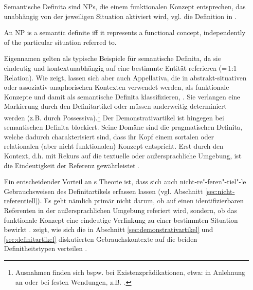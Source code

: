 \noindent
Semantische Definita sind NPs, die einem funktionalen Konzept entsprechen, das unabhängig von der jeweiligen Situation aktiviert wird, vgl. die Definition in . 

\begin{exe}
	\ex \label{semdef}  An NP is a semantic definite iff it represents a functional concept, independently of the particular situation referred to. \parencite[299]{Lobner1985}
\end{exe}

Eigennamen gelten als typische Beispiele für semantische Definita, da sie eindeutig und kontextunabhängig auf eine bestimmte Entität referieren (=\,1:1 Relation). Wie \textcite[299--307]{Lobner1985} zeigt, lassen sich aber auch Appellativa, die in abstrakt-situativen oder assoziativ-anaphorischen Kontexten verwendet werden, als funktionale Konzepte und damit als semantische Definita klassifizieren, \parencite[s. hierzu auch ausführlich][104--110]{Demske2001}. Sie verlangen eine Markierung durch den Definitartikel oder müssen anderweitig determiniert werden (z.B. durch Possessiva).\footnote{Ausnahmen finden sich bspw. bei Existenzprädikationen, etwa:  in Anlehnung an \textcite[297]{Lobner1985} oder bei festen Wendungen, z.B.  \parencite[311]{Lobner1985}.}
Der Demonstrativartikel ist hingegen bei semantischen Definita blockiert. Seine Domäne sind die pragmatischen Definita, welche dadurch charakterisiert sind, dass ihr Kopf einem sortalen oder relationalen (aber nicht funktionalen) Konzept entspricht. Erst durch den Kontext, d.h. mit Rekurs auf die textuelle oder außersprachliche Umgebung, ist die Eindeutigkeit der Referenz gewährleistet \parencite[307]{Lobner1985}. 

Ein entscheidender Vorteil an \citeauthor{Lobner1985}s Theorie ist, dass sich auch nicht-re"-feren"-tiel"-le Gebrauchsweisen des Definitartikels erfassen lassen (vgl. Abschnitt \ref{sec:nicht-referentiell}). Es geht nämlich primär nicht darum, ob auf einen  identifizierbaren Referenten in der außersprachlichen Umgebung referiert wird, sondern, ob das funktionale Konzept eine eindeutige Verlinkung zu einer bestimmten Situation bewirkt \parencite[304ff.]{Lobner1985}. 
 zeigt, wie sich die in Abschnitt \ref{sec:demonstrativartikel} und \ref{sec:definitartikel} diskutierten Gebrauchskontexte auf die beiden Definitheitstypen verteilen \parencite[angelehnt an und erweitert nach][73]{Szczepaniak2011a}. 

